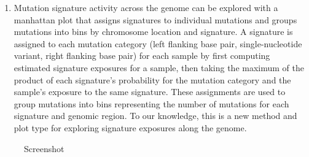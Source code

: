 \documentclass[12pt, letterpaper]{article}
\begin{document}
\begin{enumerate}
\item Mutation signature activity across the genome can be explored with a manhattan plot that assigns signatures to individual mutations and groups mutations into bins by chromosome location and signature.
    A signature is assigned to each mutation category (left flanking base pair, single-nucleotide variant, right flanking base pair) for each sample by first computing estimated signature exposures for a sample, then taking the maximum of the product of each signature's probability for the mutation category and the sample's exposure to the same signature.
    These assignments are used to group mutations into bins representing the number of mutations for each signature and genomic region.
    To our knowledge, this is a new method and plot type for exploring signature exposures along the genome.

\end{enumerate}

\begin{figure}
    \caption{Screenshot}
    \centering
\end{figure}
\end{document}
